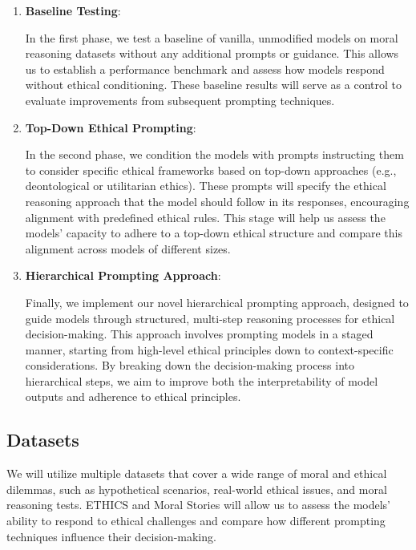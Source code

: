 \documentclass{article}
\begin{document}
\begin{enumerate}
    \item \textbf{Baseline Testing}:
    
    In the first phase, we test a baseline of vanilla, unmodified models on moral reasoning datasets without any additional prompts or guidance. This allows us to establish a performance benchmark and assess how models respond without ethical conditioning. These baseline results will serve as a control to evaluate improvements from subsequent prompting techniques.
    
    \item \textbf{Top-Down Ethical Prompting}:
    
    In the second phase, we condition the models with prompts instructing them to consider specific ethical frameworks based on top-down approaches (e.g., deontological or utilitarian ethics). These prompts will specify the ethical reasoning approach that the model should follow in its responses, encouraging alignment with predefined ethical rules. This stage will help us assess the models' capacity to adhere to a top-down ethical structure and compare this alignment across models of different sizes.
    
    \item \textbf{Hierarchical Prompting Approach}:
    
    Finally, we implement our novel hierarchical prompting approach, designed to guide models through structured, multi-step reasoning processes for ethical decision-making. This approach involves prompting models in a staged manner, starting from high-level ethical principles down to context-specific considerations. By breaking down the decision-making process into hierarchical steps, we aim to improve both the interpretability of model outputs and adherence to ethical principles.
\end{enumerate}

\subsection{Datasets}

We will utilize multiple datasets that cover a wide range of moral and ethical dilemmas, such as hypothetical scenarios, real-world ethical issues, and moral reasoning tests. ETHICS \cite{hendrycks_aligning_2023} and Moral Stories \cite{emelin_moral_2020} will allow us to assess the models' ability to respond to ethical challenges and compare how different prompting techniques influence their decision-making.
\end{document}

